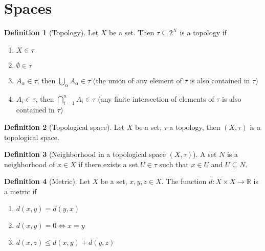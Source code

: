 \documentclass{article}
\newcommand{\ar}{\rightarrow}
\newenvironment{enumrom}{\begin{enumerate}[label=(\roman*)]}{\end{enumerate}}
\theoremstyle{definition}
\newtheorem{definition}{Definition}[section]
\theoremstyle{definition}
\theoremstyle{plain}
\theoremstyle{plain}
\theoremstyle{plain}
\theoremstyle{plain}
\theoremstyle{definition}
\theoremstyle{remark}
\theoremstyle{remark}
\theoremstyle{remark}
\theoremstyle{remark}
\newcommand{\R}{\mathbb{R}}
\begin{document}
\section{Spaces}


\begin{definition}[Topology]
  Let $X$ be a set. Then $\tau \subseteq 2^X$ is a topology if
  \begin{enumrom}
  \item $X \in \tau$
  \item $\emptyset \in \tau$
  \item $A_\alpha \in \tau$, then $\displaystyle \bigcup_\alpha A_\alpha \in \tau$ (the union of any element of $\tau$ is also contained in $\tau$)
  \item $A_i \in \tau$, then $\displaystyle \bigcap_{i = 1}^n A_i \in \tau$ (any finite intersection of elements of $\tau$ is also contained in $\tau$)
  \end{enumrom}
\end{definition}



\begin{definition}[Topological space]
  Let $X$ be a set, $\tau$ a topology, then $(X, \tau)$ is a topological space.
\end{definition}


\begin{definition}[Neighborhood in a topological space $(X, \tau)$]
  A set $N$ is a neighborhood of $x \in X$ if there exists a set $U \in \tau$ such that $x \in U$ and $U \subseteq N$.
\end{definition}


\begin{definition}[Metric]
  Let $X$ be a set, $x, y, z \in X$. The function $d : X \times X \ar \R$ is a metric if
  \begin{enumrom}
  \item $d(x,y) = d(y,x)$
  \item $d(x,y) = 0 \iff x = y$
  \item $d(x,z) \leq d(x,y) + d(y,z)$
  \end{enumrom}
\end{definition}
\end{document}
